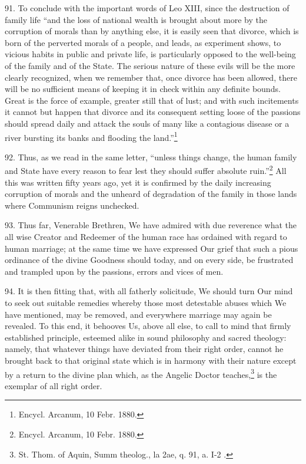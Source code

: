 \documentclass[12pt,a4paper]{book}
\begin{document}
91. To conclude with the important words of Leo XIII, since the destruction of family life ``and the loss of national wealth is brought about more by the corruption of morals than by anything else, it is easily seen that divorce, which is born of the perverted morals of a people, and leads, as experiment shows, to vicious habits in public and private life, is particularly opposed to the well-being of the family and of the State. The serious nature of these evils will be the more clearly recognized, when we remember that, once divorce has been allowed, there will be no sufficient means of keeping it in check within any definite bounds. Great is the force of example, greater still that of lust; and with such incitements it cannot but happen that divorce and its consequent setting loose of the passions should spread daily and attack the souls of many like a contagious disease or a river bursting its banks and flooding the land.''\footnote{Encycl. Arcanum, 10 Febr. 1880.}

92. Thus, as we read in the same letter, ``unless things change, the human family and State have every reason to fear lest they should suffer absolute ruin.''\footnote{Encycl. Arcanum, 10 Febr. 1880.} All this was written fifty years ago, yet it is confirmed by the daily increasing corruption of morals and the unheard of degradation of the family in those lands where Communism reigns unchecked.

93. Thus far, Venerable Brethren, We have admired with due reverence what the all wise Creator and Redeemer of the human race has ordained with regard to human marriage; at the same time we have expressed Our grief that such a pious ordinance of the divine Goodness should today, and on every side, be frustrated and trampled upon by the passions, errors and vices of men.

94. It is then fitting that, with all fatherly solicitude, We should turn Our mind to seek out suitable remedies whereby those most detestable abuses which We have mentioned, may be removed, and everywhere marriage may again be revealed. To this end, it behooves Us, above all else, to call to mind that firmly established principle, esteemed alike in sound philosophy and sacred theology: namely, that whatever things have deviated from their right order, cannot he brought back to that original state which is in harmony with their nature except by a return to the divine plan which, as the Angelic Doctor teaches,\footnote{St. Thom. of Aquin, Summ theolog., la 2ae, q. 91, a. I-2 .} is the exemplar of all right order.
\end{document}
